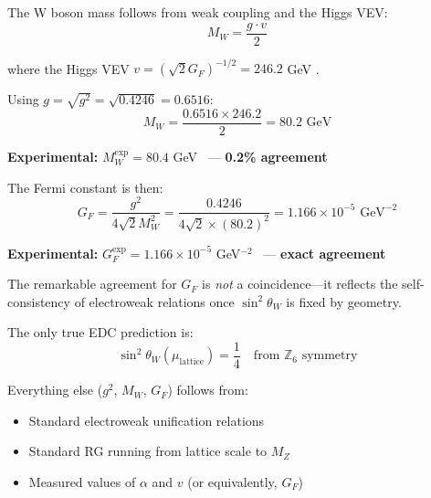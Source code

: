 \begin{theorem}
\label{thm:ch3_fermi}
\tagDc{}

The W boson mass follows from weak coupling and the Higgs VEV:
\begin{equation}
M_W = \frac{g \cdot v}{2}
\end{equation}

where the Higgs VEV $v = (\sqrt{2} G_F)^{-1/2} = 246.2$ GeV \tagBL{}.

Using $g = \sqrt{g^2} = \sqrt{0.4246} = 0.6516$:
\begin{equation}
\boxed{M_W = \frac{0.6516 \times 246.2}{2} = 80.2 \text{ GeV}}
\end{equation}

\textbf{Experimental:} $M_W^{\text{exp}} = 80.4$ GeV~\cite{PDG2024} \tagBL{} --- \textbf{0.2\% agreement}

The Fermi constant is then:
\begin{equation}
G_F = \frac{g^2}{4\sqrt{2} M_W^2} = \frac{0.4246}{4\sqrt{2} \times (80.2)^2} = 1.166 \times 10^{-5} \text{ GeV}^{-2}
\end{equation}

\textbf{Experimental:} $G_F^{\text{exp}} = 1.166 \times 10^{-5}$ GeV$^{-2}$~\cite{PDG2024} \tagBL{} --- \textbf{exact agreement}
\end{theorem}

\begin{remark}
The remarkable agreement for $G_F$ is \emph{not} a coincidence---it reflects the
self-consistency of electroweak relations once $\sin^2\theta_W$ is fixed by geometry.

The only true EDC prediction is:
\begin{equation}
\sin^2\theta_W(\mu_{\text{lattice}}) = \frac{1}{4} \quad \text{from } \mathbb{Z}_6 \text{ symmetry}
\end{equation}

Everything else ($g^2$, $M_W$, $G_F$) follows from:
\begin{itemize}
\item Standard electroweak unification relations
\item Standard RG running from lattice scale to $M_Z$
\item Measured values of $\alpha$ and $v$ (or equivalently, $G_F$)
\end{itemize}
\end{remark}

